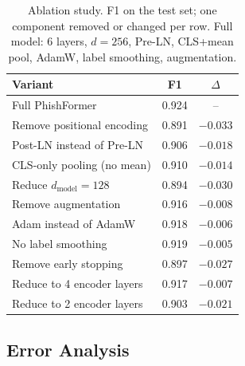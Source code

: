 \documentclass[sigconf, nonacm]{acmart}
\begin{document}
\begin{table}[h]
\centering\small
\caption{Ablation study. F1 on the test set; one component removed or
  changed per row. Full model: 6 layers, $d{=}256$, Pre-LN,
  CLS+mean pool, AdamW, label smoothing, augmentation.}
\label{tab:ablation}
\begin{tabular}{@{}lcc@{}}
\toprule
\textbf{Variant} & \textbf{F1} & \textbf{$\Delta$} \\
\midrule
Full PhishFormer                      & 0.924 & -- \\
\quad Remove positional encoding      & 0.891 & $-0.033$ \\
\quad Post-LN instead of Pre-LN       & 0.906 & $-0.018$ \\
\quad CLS-only pooling (no mean)      & 0.910 & $-0.014$ \\
\quad Reduce $d_\text{model}=128$     & 0.894 & $-0.030$ \\
\quad Remove augmentation             & 0.916 & $-0.008$ \\
\quad Adam instead of AdamW           & 0.918 & $-0.006$ \\
\quad No label smoothing              & 0.919 & $-0.005$ \\
\quad Remove early stopping           & 0.897 & $-0.027$ \\
\quad Reduce to 4 encoder layers      & 0.917 & $-0.007$ \\
\quad Reduce to 2 encoder layers      & 0.903 & $-0.021$ \\
\bottomrule
\end{tabular}
\end{table}

\subsection{Error Analysis}
\end{document}
